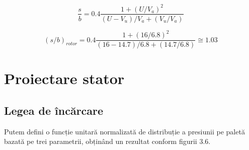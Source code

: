\begin{equation}
\frac{s}{b} = 0.4 \frac{1 + (U / V_a)^2 } {(U - V_u) / V_a + (V_u / V_a)}
\end{equation}

\begin{equation}
(s/b)_{rotor} = 0.4 \frac{1 + (16 / 6.8)^2 } {(16 - 14.7) / 6.8 + (14.7 / 6.8)} \cong 1.03
\end{equation}

\clearpage


\section{Proiectare stator}

\subsection{Legea de încărcare}

Putem defini o funcție unitară normalizată de distribuție a presiunii pe paletă bazată pe trei parametrii, obținând un rezultat conform figurii 3.6.


